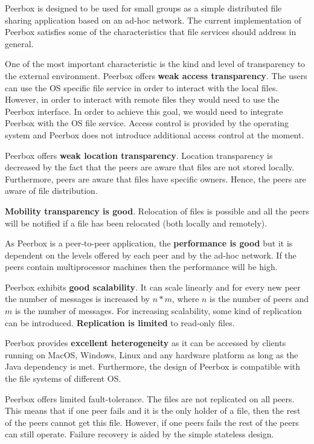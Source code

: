 
Peerbox is designed to be used for small groups as a simple distributed file sharing application based on an ad-hoc network. The current implementation of Peerbox satisfies some of the characteristics that file services should address in general.

One of the most important characteristic is the kind and level of transparency to the external environment. Peerbox offers \textbf{weak access transparency}. The users can use the OS specific file service in order to interact with the local files. However, in order to interact with remote files they would need to use the Peerbox interface. In order to achieve this goal, we would need to integrate Peerbox with the OS file service.  Access control is provided by the operating system and Peerbox does not introduce additional access control at the moment.

Peerbox offers \textbf{weak location transparency}. Location transparency is decreased by the fact that the peers are aware that  files are not stored locally. Furthermore, peers are aware that files have specific owners. Hence, the peers are aware of file distribution.

\textbf{Mobility transparency is good}. Relocation of files is possible and all the peers will be notified if a file has been relocated (both locally and remotely).

As Peerbox is a peer-to-peer application, the \textbf{performance is good} but it is dependent on the levels offered by each peer and by the ad-hoc network. If the peers contain multiprocessor machines then the performance will be high.


Peerbox exhibits \textbf{good scalability}. It can scale linearly and for every new peer the number of messages is increased by $n*m$, where $n$ is the number of peers and $m$ is the number of messages. For increasing scalability, some kind of replication can be introduced. \textbf{Replication is limited} to read-only files.

Peerbox provides \textbf{excellent heterogeneity} as it can be accessed by clients running on MacOS, Windows, Linux and any hardware platform as long as the Java dependency is met. Furthermore, the design of Peerbox is compatible with the file systems of different OS.

Peerbox offers limited fault-tolerance. The files are not replicated on all peers. This means that if one peer fails and it is the only holder of a file, then the rest of the peers cannot get this file. However, if one peers fails the rest of the peers can still operate. Failure recovery is aided by the simple stateless design.

